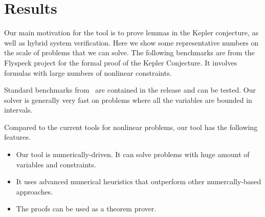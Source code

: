 \documentclass[envcountsect]{llncs}
\begin{document}
\section{Results}

Our main motivation for the tool is to prove lemmas in the Kepler conjecture,
as well as hybrid system verification. Here we show some representative numbers
on the scale of problems that we can solve. The following benchmarks are from
the Flyspeck project for the formal proof of the Kepler Conjecture. It involves
formulas with large numbers of nonlinear constraints. 



Standard benchmarks from~\cite{DBLP:conf/cade/JovanovicM12} are contained in the release
and can be tested. Our solver is generally very fast on problems where all the
variables are bounded in intervals. 

Compared to the current tools for nonlinear problems, our tool has the following
features. 
\begin{itemize}
\item Our tool is numerically-driven. It can solve problems with huge amount of variables and constraints.
\item It uses advanced numerical heuristics that outperform other
numercally-based approaches.
\item The proofs can be used as a theorem prover.
\end{itemize}




\end{document}
